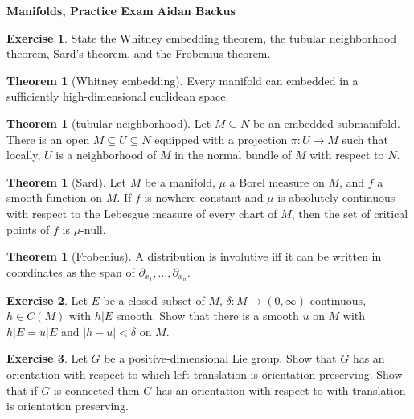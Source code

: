 \documentclass[10pt]{article}
\theoremstyle{definition}
\newtheorem{exer}{Exercise}
\newtheorem{theorem}[lemma]{Theorem}
\begin{document}
\noindent
\large\textbf{Manifolds, Practice Exam} \hfill \textbf{Aidan Backus} \\


\begin{exer}
State the Whitney embedding theorem, the tubular neighborhood theorem, Sard's theorem, and the Frobenius theorem.
\end{exer}

\begin{theorem}[Whitney embedding]
Every manifold can embedded in a sufficiently high-dimensional euclidean space.
\end{theorem}

\begin{theorem}[tubular neighborhood]
Let $M \subseteq N$ be an embedded submanifold. There is an open $M \subseteq U \subseteq N$ equipped with a projection $\pi: U \to M$ such that locally, $U$ is a neighborhood of $M$ in the normal bundle of $M$ with respect to $N$.
\end{theorem}

\begin{theorem}[Sard]
Let $M$ be a manifold, $\mu$ a Borel measure on $M$, and $f$ a smooth function on $M$.
If $f$ is nowhere constant and $\mu$ is absolutely continuous with respect to the Lebesgue measure of every chart of $M$, then the set of critical points of $f$ is $\mu$-null.
\end{theorem}

\begin{theorem}[Frobenius]
A distribution is involutive iff it can be written in coordinates as the span of $\partial_{x_1}, \dots, \partial_{x_n}$.
\end{theorem}

\begin{exer}
Let $E$ be a closed subset of $M$, $\delta: M \to (0, \infty)$ continuous, $h \in C(M)$ with $h|E$ smooth.
Show that there is a smooth $u$ on $M$ with $h|E = u|E$ and $|h - u| < \delta$ on $M$.
\end{exer}

\begin{exer}
Let $G$ be a positive-dimensional Lie group. Show that $G$ has an orientation with respect to which left translation is orientation preserving.
Show that if $G$ is connected then $G$ has an orientation with respect to with translation is orientation preserving.
\end{exer}
\end{document}
